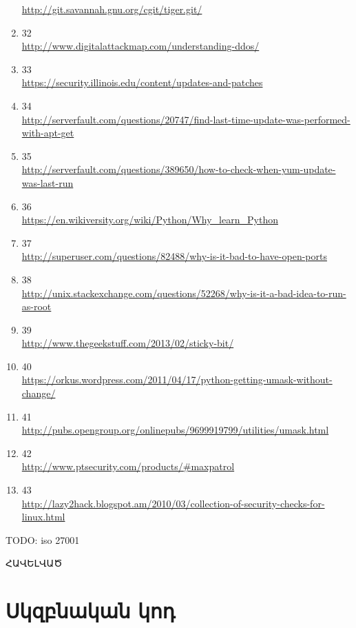 \documentclass[a4paper,12pt]{article}
\begin{document}
\begin{sloppypar}
\begin{enumerate}
	\url{http://git.savannah.gnu.org/cgit/tiger.git/}
\item 32 \\
	\url{http://www.digitalattackmap.com/understanding-ddos/}
\item 33 \\
	\url{https://security.illinois.edu/content/updates-and-patches}
\item 34 \\
	\url{http://serverfault.com/questions/20747/find-last-time-update-was-performed-with-apt-get}
\item 35 \\
	\url{http://serverfault.com/questions/389650/how-to-check-when-yum-update-was-last-run}
\item 36 \\
	\url{https://en.wikiversity.org/wiki/Python/Why\_learn\_Python}
\item 37 \\
	\url{http://superuser.com/questions/82488/why-is-it-bad-to-have-open-ports}
\item 38 \\
	\url{http://unix.stackexchange.com/questions/52268/why-is-it-a-bad-idea-to-run-as-root}
\item 39 \\
	\url{http://www.thegeekstuff.com/2013/02/sticky-bit/}
\item 40 \\
	\url{https://orkus.wordpress.com/2011/04/17/python-getting-umask-without-change/}
\item 41 \\
	\url{http://pubs.opengroup.org/onlinepubs/9699919799/utilities/umask.html}
\item 42 \\
	\url{http://www.ptsecurity.com/products/#maxpatrol}
\item 43 \\
	\url{http://lazy2hack.blogspot.am/2010/03/collection-of-security-checks-for-linux.html}
\end{enumerate}


TODO: iso 27001


\newpage
\vspace*{\fill}
\begingroup
\centering
\centerline{\Huge{ՀԱՎԵԼՎԱԾ}}
\endgroup
\vspace*{\fill}
\newpage


\section*{Սկզբնական կոդ}



\end{sloppypar}
\end{document}
